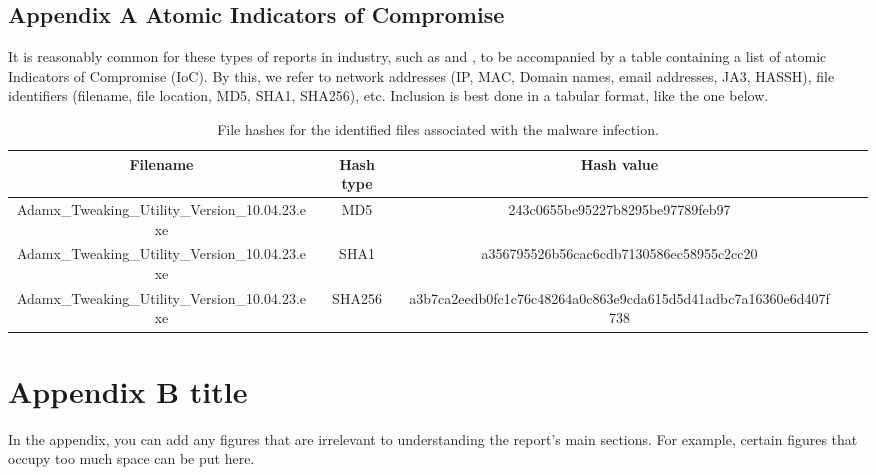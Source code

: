 \begin{landscape}
    \section{Appendix A Atomic Indicators of Compromise} \label{section: appendix A titleAtomic Indicators of Compromise}
    It is reasonably common for these types of reports in industry, such as \cite{coathanger} and \cite{vmware-esxi-ransomware}, to be accompanied by a table containing a list of atomic Indicators of Compromise (IoC). By this, we refer to network addresses (IP, MAC, Domain names, email addresses, JA3, HASSH), file identifiers (filename, file location, MD5, SHA1, SHA256), etc. Inclusion is best done in a tabular format, like the one below.
    \begin{table}[ht]
    \centering
    \caption{File hashes for the identified files associated with the malware infection.}
    \begin{tabular}[t]{ccccc}
    \toprule
    \color{Tue-red}\textbf{Filename}&\color{Tue-red}\textbf{Hash type}&\color{Tue-red}\textbf{Hash value}\\
    \midrule
    Adamx\_Tweaking\_Utility\_Version\_10.04.23.exe&MD5&243c0655be95227b8295be97789feb97\\
    Adamx\_Tweaking\_Utility\_Version\_10.04.23.exe&SHA1&a356795526b56cac6cdb7130586ec58955c2cc20\\
    Adamx\_Tweaking\_Utility\_Version\_10.04.23.exe&SHA256&a3b7ca2eedb0fc1c76c48264a0c863e9cda615d5d41adbc7a16360e6d407f738\\
    \bottomrule
    \end{tabular}
    \label{table: style 1}
    \end{table}
\end{landscape}

\section{Appendix B title} \label{section: appendix B title}
In the appendix, you can add any figures that are irrelevant to understanding the report's main sections. For example, certain figures that occupy too much space can be put here.